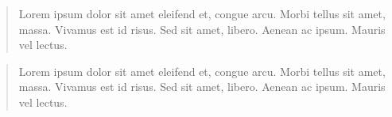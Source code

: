 \begin{abstract}
    Lorem ipsum dolor sit amet eleifend et, congue arcu. Morbi tellus sit amet, massa. Vivamus est id risus. Sed sit amet, libero. Aenean ac ipsum. Mauris vel lectus.
\end{abstract}
\mykeywords

{
\begin{abstract}
    Lorem ipsum dolor sit amet eleifend et, congue arcu. Morbi tellus sit amet, massa. Vivamus est id risus. Sed sit amet, libero. Aenean ac ipsum. Mauris vel lectus.
\end{abstract}
\mykeywords
}
